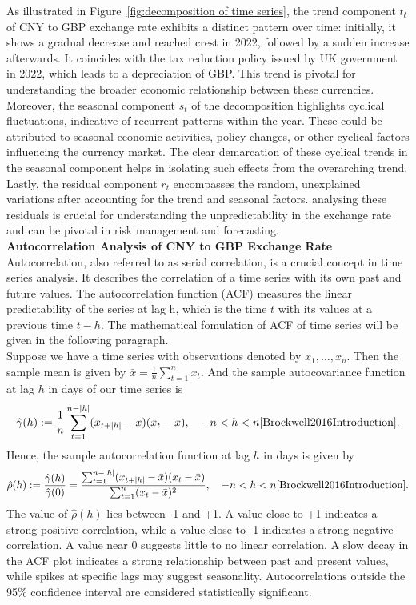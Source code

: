 \documentclass{article}\usepackage[]{graphicx}\usepackage[]{xcolor}
\numberwithin{equation}{section}
\begin{document}
\noindent
As illustrated in Figure~\ref{fig:decomposition of time series}, the trend component $t_t$ of CNY to GBP exchange rate exhibits a distinct pattern over time: initially, it shows a gradual decrease and reached crest in 2022, followed by a sudden increase afterwards. It coincides with the tax reduction policy issued by UK government in 2022, which leads to a depreciation of GBP. This trend is pivotal for understanding the broader economic relationship between these currencies. \\

\noindent
Moreover, the seasonal component $s_t$ of the decomposition highlights cyclical fluctuations, indicative of recurrent patterns within the year. These could be attributed to seasonal economic activities, policy changes, or other cyclical factors influencing the currency market. The clear demarcation of these cyclical trends in the seasonal component helps in isolating such effects from the overarching trend.\\

\noindent
Lastly, the residual component $r_t$ encompasses the random, unexplained variations after accounting for the trend and seasonal factors. analysing these residuals is crucial for understanding the unpredictability in the exchange rate and can be pivotal in risk management and forecasting.\\

\noindent
\textbf{Autocorrelation Analysis of CNY to GBP Exchange Rate}\\
\noindent
Autocorrelation, also referred to as serial correlation, is a crucial concept in time series analysis. It describes the correlation of a time series with its own past and future values. The autocorrelation function (ACF) measures the linear predictability of the series at lag h, which is the time $t$ with its values at a previous time $t-h$. The mathematical fomulation of ACF of time series will be given in the following paragraph.\\

\noindent
Suppose we have a time series with observations denoted by \( x_1, \ldots, x_n \). Then the sample mean is given by $\bar{x} = \frac{1}{n} \sum_{t=1}^{n} x_t.$
And the sample autocovariance function at lag $h$ in days of our time series is
\[\hat{\gamma}(h) := \frac{1}{n} \sum_{t=1}^{n-|h|} (x_{t+|h|} - \bar{x})(x_t - \bar{x}), \quad -n < h < n \cite{Brockwell2016Introduction}.\]
Hence, the sample autocorrelation function at lag $h$ in days is given by
\[\hat{\rho}(h) := \frac{\hat{\gamma}(h)}{\hat{\gamma}(0)} = \frac{\sum_{t=1}^{n-|h|} (x_{t+|h|} - \bar{x})(x_t - \bar{x})}{\sum_{t=1}^{n} (x_t - \bar{x})^{2}}, \quad -n < h < n \cite{Brockwell2016Introduction}.\]
\noindent
The value of $\hat{\rho}(h)$ lies between -1 and +1. A value close to +1 indicates a strong positive correlation, while a value close to -1 indicates a strong negative correlation. A value near 0 suggests little to no linear correlation. A slow decay in the ACF plot indicates a strong relationship between past and present values, while spikes at specific lags may suggest seasonality. Autocorrelations outside the 95\% confidence interval are considered statistically significant.\\
\end{document}
